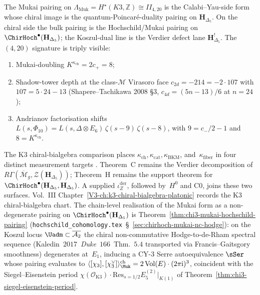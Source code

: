 \begin{remark}
\label{rem:pdq-1}
The Mukai pairing on
$\Lambda_{\mathrm{Muk}} = H^\star(K3,\mathbb Z) \cong II_{4,20}$
is the Calabi--Yau-side form whose chiral image is the
quantum-Poincar\'e-duality pairing on $\mathbf H_{\Delta_5}$.  On the
chiral side the bulk pairing is the Hochschild/Mukai pairing on
$\ChirHoch^\bullet(\mathbf H_{\Delta_5})$; the Koszul-dual line is the
Verdier defect lane $\mathbf H_{\Delta_5}^!$.
The $(4,20)$ signature is triply visible:
\begin{enumerate}
 \item Mukai-doubling $K^{\kappa_{\mathrm{ch}}} = 2c_+ = 8$;
 \item Shadow-tower depth at the class-$\mathcal M$ Virasoro face
 $c_{2d} = -214 = -2\cdot 107$ with $107 = 5\cdot 24 - 13$
 (Shapere--Tachikawa 2008 \S 3, $c_{4d} = (5n-13)/6$ at $n=24$);
 \item Andrianov factorisation shifts
 $L(s,\Phi_{10}) = L(s,\Delta\otimes E_6)\,\zeta(s-9)\,\zeta(s-8)$,
 with $9 = c_-/2-1$ and $8 = K^{\kappa_{\mathrm{ch}}}$.
\end{enumerate}
The K3 chiral-bialgebra comparison places
$\kappa_{\mathrm{ch}},\kappa_{\mathrm{cat}},\kappa_{\mathrm{BKM}}$,
and~$\kappa_{\mathrm{fiber}}$ in four distinct measurement targets
\cite{Mukai1987,Bruinier2002,Borcherds1998}.  Theorem~C remains the
Verdier decomposition of
$R\Gamma(\overline{\mathcal M}_g,\mathcal Z(\mathbf H_{\Delta_5}))$;
Theorem~H remains the support theorem for
$\ChirHoch^\bullet(\mathbf H_{\Delta_5},\mathbf H_{\Delta_5})$.
A supplied $\iota_Z^{\mathrm{der}}$, followed by~$H^0$ and C0, joins
these two surfaces.
Vol.~III Chapter~\ref{V3-ch:k3-chiral-bialgebra-platonic} records
the K3 chiral-bialgebra chart.  The chain-level realisation of the
Mukai form as a non-degenerate
pairing on $\ChirHoch^\bullet(\mathbf H_{\Delta_5})$ is
Theorem~\ref{thm:chi3-mukai-hochschild-pairing}
(\texttt{hochschild\_cohomology.tex}~\S~\ref{sec:chirhoch-mukai-nc-hodge}):
on the Koszul locus $\Uadm\subset\overline{\mathcal A_2}$ the
chiral non-commutative Hodge-to-de-Rham spectral sequence
(Kaledin~$2017$~\emph{Duke}~$166$~Thm.~$5.4$ transported via
Francis--Gaitsgory smoothness) degenerates at~$E_1$, inducing a
CY-$3$ Serre autoequivalence $\sSer$ whose pairing evaluates to
$\langle[\chi_3],[\chi_3^\vee]\rangle^{\mathrm{ch}}_{\Muk}
=2\,\mathrm{Vol}(E)\cdot(2\pi\mathrm i)^3$, coincident with the
Siegel--Eisenstein period
$\chi(\mathcal O_{\mathrm{K3}})\cdot
\mathrm{Res}_{s=1/2}E_5^{(2)}|_{K(1)}$ of
Theorem~\ref{thm:chi3-siegel-eisenstein-period}.
\end{remark}


